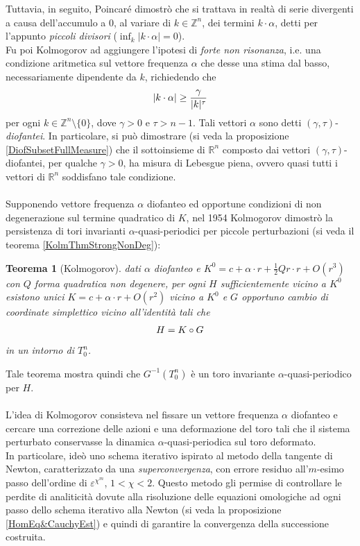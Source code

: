 \documentclass[twoside, 11pt]{amsbook}
\newcommand{\Z}{\mathbb{Z}}
\newcommand{\0}{{(0)}}
\newcommand{\3}{{(3)}}
\theoremstyle{colonplain}
\newtheorem{thm}{Teorema}[chapter]
\theoremstyle{colondefinition}
\theoremstyle{colonremark}
\numberwithin{equation}{chapter}
\begin{document}
Tuttavia, in seguito, Poincaré dimostrò che si trattava in realtà di serie divergenti a causa dell'accumulo a $0$, al variare di $k\in\Z^n$, dei termini $k \cdot \alpha$, detti per l'appunto \textit{piccoli divisori} ($\inf_k |k \cdot \alpha| = 0$). \\ 
Fu poi Kolmogorov ad aggiungere l'ipotesi di \textit{forte non risonanza}, i.e. una condizione aritmetica sul vettore frequenza $\alpha$ che desse una stima dal basso, necessariamente dipendente da $k$, richiedendo che
\begin{align}
    |k \cdot \alpha| \geq \frac{\gamma}{|k|^\tau} \notag
\end{align}
per ogni $k \in \mathbb{Z}^n \setminus \{0\}$, dove $\gamma > 0$ e $\tau > n - 1$. Tali vettori $\alpha$ sono detti $(\gamma, \tau)$-\textit{diofantei}. In particolare, si può dimostrare (si veda la proposizione \ref{DiofSubsetFullMeasure}) che il sottoinsieme di $\mathbb{R}^n$ composto dai vettori $(\gamma, \tau)$-diofantei, per qualche $\gamma > 0$, ha misura di Lebesgue piena, ovvero quasi tutti i vettori di $\mathbb{R}^n$ soddisfano tale condizione. \\ \\
Supponendo vettore frequenza $\alpha$ diofanteo ed opportune condizioni di non degenerazione sul termine quadratico di $K$, nel 1954 Kolmogorov dimostrò la persistenza di tori invarianti $\alpha$-quasi-periodici per piccole perturbazioni  (si veda il teorema \ref{KolmThmStrongNonDeg}):
\begin{thm}[Kolmogorov]
dati $\alpha$ diofanteo e $K^0 = c + \alpha \cdot r + \frac{1}{2}Qr \cdot r + O(r^3)$ con $Q$ forma quadratica non degenere, per ogni $H$ sufficientemente vicino a $K^0$ esistono unici $K = c + \alpha \cdot r + O(r^2)$ vicino a $K^0$ e $G$ opportuno cambio di coordinate simplettico vicino all'identità tali che
\begin{align}
    H = K \circ G \notag
\end{align}
in un intorno di $T^n_0$.
\end{thm}
Tale teorema mostra quindi che $G^{-1}(T^n_0)$ è un toro invariante $\alpha$-quasi-periodico per $H$. \\ \\
L'idea di Kolmogorov consisteva nel fissare un vettore frequenza $\alpha$ diofanteo e cercare una correzione delle azioni e una deformazione del toro tali che il sistema perturbato conservasse la dinamica $\alpha$-quasi-periodica sul toro deformato. \\
In particolare, ideò uno schema iterativo ispirato al metodo della tangente di Newton, caratterizzato da una \textit{superconvergenza}, con errore residuo all'$m$-esimo passo dell'ordine di $\varepsilon^{\chi^m}$, $1 < \chi < 2$. Questo metodo gli permise di controllare le perdite di analiticità dovute alla risoluzione delle equazioni omologiche ad ogni passo dello schema iterativo alla Newton (si veda la proposizione \ref{HomEq&CauchyEst}) e quindi di garantire la convergenza della successione costruita. \\ \\
\end{document}
